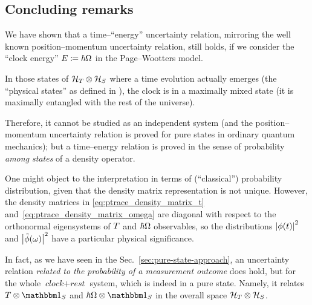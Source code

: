 \subsection{Concluding remarks}

We have shown that a time--``energy'' uncertainty relation,
mirroring the well known position--momentum uncertainty relation,
still holds, if we consider the ``clock energy'' ${E} \coloneqq \hbar{\Omega}$
in the Page--Wootters model.

In those states of $\mathcal{H}_T \otimes \mathcal{H}_S$ where a time evolution actually emerges
(the ``physical states'' as defined in \cite{Lloyd:Time}),
the clock is in a maximally mixed state
(it is maximally entangled with the rest of the universe).

Therefore, it cannot be studied as an independent system
(and the position--momentum uncertainty relation is proved
for pure states in ordinary quantum mechanics); but a
time--energy relation is proved in the sense of probability
\emph{among states} of a density operator.

One might object to the interpretation in terms of (``classical'')
probability distribution, given
that the density matrix representation is
not unique.
However, the density matrices
in \eqref{eq:ptrace_density_matrix_t} and~\eqref{eq:ptrace_density_matrix_omega}
are diagonal with respect to
the orthonormal eigensystems of ${T}$ and $\hbar {\Omega}$ observables,
so the distributions $\abs{\phi(t)}^2$ and $\abs{\tilde{\phi}(\omega)}^2$
have a particular physical significance.

In fact, as we have seen in the Sec.~\ref{sec:pure-state-approach},
an uncertainty relation
\emph{related to the probability of a measurement outcome}
does hold,
but for the whole
$\textit{clock} + \textit{rest}$ system, which is indeed in a pure state.
Namely, it relates $\op{T}\ox\idop_S$ and $\hbar\op{\Omega}\ox\idop_S$
in the overall space $\mathcal{H}_T \otimes \mathcal{H}_S$.